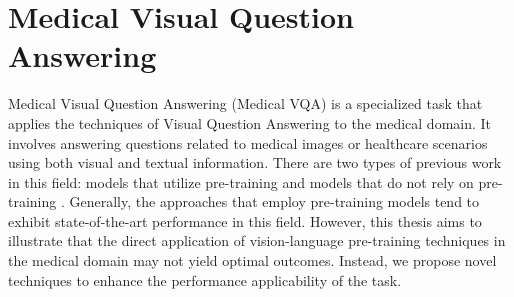 \section{Medical Visual Question Answering}
\label{medvqa}
Medical Visual Question Answering (Medical VQA) \cite{liu2021slake, DBLP:journals/corr/abs-2003-10286, lau2018dataset, ben2019vqa} is a specialized task that applies the techniques of Visual Question Answering to the medical domain. It involves answering questions related to medical images or healthcare scenarios using both visual and textual information. There are two types of previous work in this field: models that utilize pre-training \cite{chen2022align, chen2023towards, moon2022multi, chen2022multi, khare2021mmbert} and models that do not rely on pre-training \cite{liu2021slake, nguyen2019overcoming, do2021multiple, gong2022vqamix, zhang2022type}. Generally, the approaches that employ pre-training models tend to exhibit state-of-the-art performance in this field. However, this thesis aims to illustrate that the direct application of vision-language pre-training techniques in the medical domain may not yield optimal outcomes. Instead, we propose novel techniques to enhance the performance applicability of the task.






